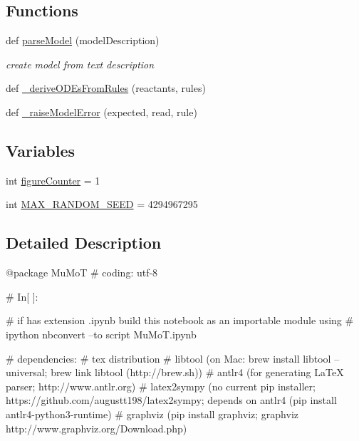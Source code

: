 \subsection*{Functions}
\begin{DoxyCompactItemize}
\item 
def \hyperlink{namespace_mu_mo_t_a563aad4a460dbcc0705cf99bb6f6dd5d}{parse\+Model} (model\+Description)
\begin{DoxyCompactList}\small\item\em create model from text description \end{DoxyCompactList}\item 
def \hyperlink{namespace_mu_mo_t_a276566fb102dd4e4bf32a9ba4fb8a09b}{\+\_\+derive\+O\+D\+Es\+From\+Rules} (reactants, rules)
\item 
def \hyperlink{namespace_mu_mo_t_a07dd350ff74bc1abafd7f44f972089a2}{\+\_\+raise\+Model\+Error} (expected, read, rule)
\end{DoxyCompactItemize}
\subsection*{Variables}
\begin{DoxyCompactItemize}
\item 
int \hyperlink{namespace_mu_mo_t_a4543afee285a2aa1cd5c8c9ca14fe77f}{figure\+Counter} = 1
\item 
int \hyperlink{namespace_mu_mo_t_ae8957aab30c8ae3e6065cd19d166ef22}{M\+A\+X\+\_\+\+R\+A\+N\+D\+O\+M\+\_\+\+S\+E\+ED} = 4294967295
\end{DoxyCompactItemize}


\subsection{Detailed Description}
\begin{DoxyVerb}@package MuMoT
# coding: utf-8

# In[ ]:

# if has extension .ipynb build this notebook as an importable module using
# ipython nbconvert --to script MuMoT.ipynb

# dependencies:
#  tex distribution
#  libtool (on Mac: brew install libtool --universal; brew link libtool (http://brew.sh))
#  antlr4 (for generating LaTeX parser; http://www.antlr.org)
#  latex2sympy (no current pip installer; https://github.com/augustt198/latex2sympy; depends on antlr4 (pip install antlr4-python3-runtime)
#  graphviz (pip install graphviz; graphviz http://www.graphviz.org/Download.php)
\end{DoxyVerb}
 

